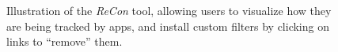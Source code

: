\begin{figure}[tb]
\hspace{0.1in}
{}
\caption{Illustration of the \emph{ReCon} tool, allowing users to visualize how they are being tracked by apps, and install custom filters by clicking on links to ``remove'' them. }
\label{fig:recon}
\vspace{\postfigspace}
\end{figure}

